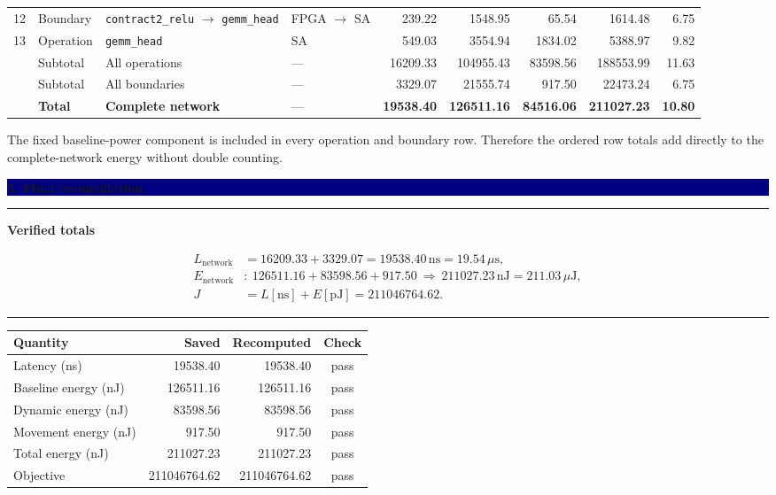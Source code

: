 \documentclass[10pt]{article}
\newcommand{\ns}{\,\mathrm{ns}}
\newcommand{\nj}{\,\mathrm{nJ}}
\newcommand{\us}{\,\mu\mathrm{s}}
\newcommand{\uj}{\,\mu\mathrm{J}}
\newenvironment{resultbox}[1]
  {\begin{center}\begin{minipage}{0.93\linewidth}\color{green}
   \hrule height 1pt\vspace{0.35em}\textbf{#1}\par\smallskip\color{black}}
  {\vspace{0.25em}\color{green}\hrule height 1pt\end{minipage}\end{center}}
\newcommand{\sectionbar}[1]{\vspace{0.5em}\noindent
  \colorbox{navy}{\parbox{\dimexpr\linewidth-2\fboxsep\relax}{
  \color{white}\large\bfseries #1}}\par\vspace{0.35em}}
\begin{document}
\begin{landscape}
\begin{tabularx}{\linewidth}{@{}r l Y l r r r r r@{}}
12 & Boundary & \texttt{contract2\_relu} $\rightarrow$ \texttt{gemm\_head} & FPGA $\rightarrow$ SA & 239.22 & 1548.95 & 65.54 & 1614.48 & 6.75 \\
13 & Operation & \texttt{gemm\_head} & SA & 549.03 & 3554.94 & 1834.02 & 5388.97 & 9.82 \\
\midrule
& Subtotal & All operations & --- & 16209.33 & 104955.43 & 83598.56 & 188553.99 & 11.63 \\
& Subtotal & All boundaries & --- & 3329.07 & 21555.74 & 917.50 & 22473.24 & 6.75 \\
& \textbf{Total} & \textbf{Complete network} & --- & \textbf{19538.40} & \textbf{126511.16} & \textbf{84516.06} & \textbf{211027.23} & \textbf{10.80} \\
\bottomrule
\end{tabularx}
\normalsize

\vspace{0.5em}
The fixed baseline-power component is included in every operation and boundary
row.  Therefore the ordered row totals add directly to the complete-network
energy without double counting.
\end{landscape}

\clearpage
\sectionbar{5. Final reconciliation}
\begin{resultbox}{Verified totals}
\begin{align*}
L_{\mathrm{network}}&=16209.33+3329.07=19538.40\ns=19.54\us,\\
E_{\mathrm{network}}&:\ 126511.16+83598.56+917.50
\ \Longrightarrow\ 211027.23\nj=211.03\uj,\\
J&=L[\mathrm{ns}]+E[\mathrm{pJ}]=211046764.62.
\end{align*}
\end{resultbox}

\begin{tabularx}{\linewidth}{@{}Y r r c@{}}
\toprule
\textbf{Quantity} & \textbf{Saved} & \textbf{Recomputed} & \textbf{Check} \\
\midrule
Latency (ns) & 19538.40 & 19538.40 & pass \\
Baseline energy (nJ) & 126511.16 & 126511.16 & pass \\
Dynamic energy (nJ) & 83598.56 & 83598.56 & pass \\
Movement energy (nJ) & 917.50 & 917.50 & pass \\
Total energy (nJ) & 211027.23 & 211027.23 & pass \\
Objective & 211046764.62 & 211046764.62 & pass \\
\bottomrule
\end{tabularx}
\end{document}
